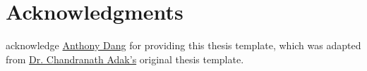 \chapter*{Acknowledgments}

{
\SingleSpace
     acknowledge \href{https://www.linkedin.com/in/anthonydotnet/}{Anthony Dang} for providing this thesis template, which was adapted from \href{https://sites.google.com/site/chandranathadak1989}{Dr. Chandranath Adak's} original thesis template.

}
\clearpage